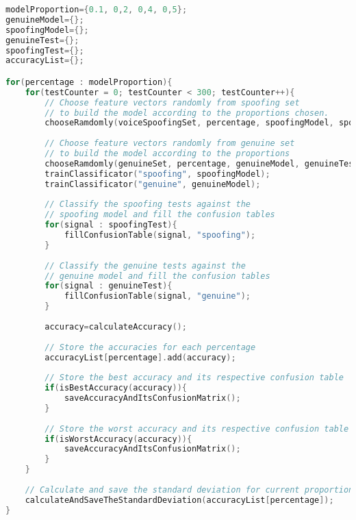 \begin{lstlisting}[language=C++, caption={Procedure 3 algorithm}, label={lst:experiment03Algo}]
modelProportion={0.1, 0,2, 0,4, 0,5};
genuineModel={};
spoofingModel={};
genuineTest={};
spoofingTest={};
accuracyList={};

for(percentage : modelProportion){
	for(testCounter = 0; testCounter < 300; testCounter++){
		// Choose feature vectors randomly from spoofing set
		// to build the model according to the proportions chosen.
		chooseRamdomly(voiceSpoofingSet, percentage, spoofingModel, spoofingTest);
		
		// Choose feature vectors randomly from genuine set
		// to build the model according to the proportions
		chooseRamdomly(genuineSet, percentage, genuineModel, genuineTest);
		trainClassificator("spoofing", spoofingModel);
		trainClassificator("genuine", genuineModel);
		
		// Classify the spoofing tests against the 
		// spoofing model and fill the confusion tables
		for(signal : spoofingTest){
			fillConfusionTable(signal, "spoofing");
		} 
		
		// Classify the genuine tests against the
		// genuine model and fill the confusion tables
		for(signal : genuineTest){
			fillConfusionTable(signal, "genuine");
		}
		
		accuracy=calculateAccuracy();
		
		// Store the accuracies for each percentage
		accuracyList[percentage].add(accuracy);
		
		// Store the best accuracy and its respective confusion table
		if(isBestAccuracy(accuracy)){
			saveAccuracyAndItsConfusionMatrix();
		}
		
		// Store the worst accuracy and its respective confusion table
		if(isWorstAccuracy(accuracy)){
			saveAccuracyAndItsConfusionMatrix();
		}
	}
	
	// Calculate and save the standard deviation for current proportion
	calculateAndSaveTheStandardDeviation(accuracyList[percentage]);
}			
\end{lstlisting}